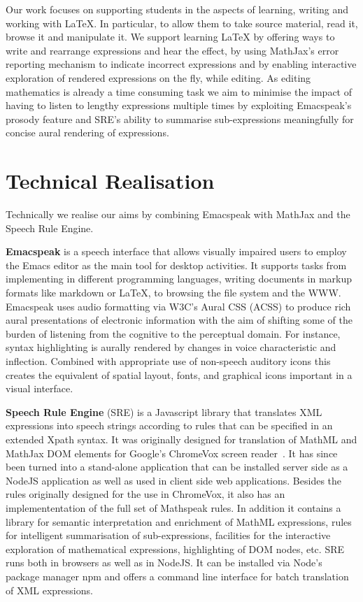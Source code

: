 \documentclass{sig-alternate-05-2015}
\newcommand{\sre}{SRE\xspace}
\begin{document}
Our work focuses on supporting students in the aspects of learning, writing and
working with {\LaTeX}. In particular, to allow them to take source material,
read it, browse it and manipulate it. We support learning {\LaTeX} by offering
ways to write and rearrange expressions and hear the effect, by using MathJax's
error reporting mechanism to indicate incorrect expressions and by enabling
interactive exploration of rendered expressions on the fly, while editing.  As
editing mathematics is already a time consuming task we aim to minimise the
impact of having to listen to lengthy expressions multiple times by exploiting
Emacspeak's prosody feature and SRE's ability to summarise sub-expressions
meaningfully for concise aural rendering of expressions.


\section{Technical Realisation}
\label{sec:background}

Technically we realise our aims by combining Emacspeak with MathJax and the
Speech Rule Engine.

\textbf{Emacspeak} is a speech interface that allows visually impaired users to
employ the Emacs editor as the main tool for desktop activities. It supports
tasks from implementing in different programming languages, writing documents in
markup formats like markdown or {\LaTeX}, to browsing the file system and the
WWW. Emacspeak uses audio formatting via W3C's Aural CSS (ACSS) to produce rich
aural presentations of electronic information with the aim of shifting some of
the burden of listening from the cognitive to the perceptual domain. For
instance, syntax highlighting is aurally rendered by changes in voice
characteristic and inflection. Combined with appropriate use of non-speech
auditory icons this creates the equivalent of spatial layout, fonts, and
graphical icons important in a visual interface.

\textbf{Speech Rule Engine} (\sre) is a Javascript library that translates XML
expressions into speech strings according to rules that can be specified in an
extended Xpath syntax. It was originally designed for translation of MathML and
MathJax DOM elements for Google's ChromeVox screen reader~\cite{Sorge14}. It has
since been turned into a stand-alone application that can be installed server
side as a NodeJS application as well as used in client side web applications.
Besides the rules originally designed for the use in ChromeVox, it also has an
implemententation of the full set of Mathspeak rules. In addition it contains a
library for semantic interpretation and enrichment of MathML expressions, rules
for intelligent summarisation of sub-expressions, facilities for the interactive
exploration of mathematical expressions, highlighting of DOM nodes, etc.  SRE
runs both in browsers as well as in NodeJS. It can be installed via Node's
package manager npm and offers a command line interface for batch translation of
XML expressions.
\end{document}
